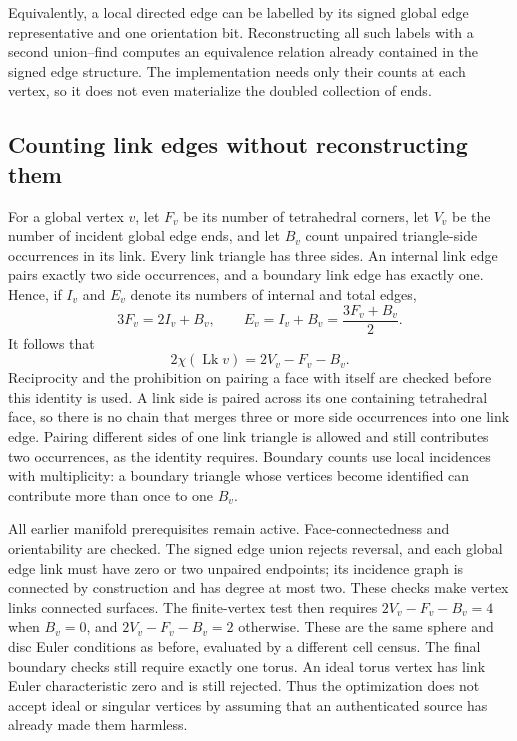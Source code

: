 Equivalently, a local directed edge can be labelled by its signed global edge
representative and one orientation bit. Reconstructing all such labels with
a second union--find computes an equivalence relation already contained in
the signed edge structure. The implementation needs only their counts at
each vertex, so it does not even materialize the doubled collection of ends.

\subsection{Counting link edges without reconstructing them}

For a global vertex $v$, let $F_v$ be its number of tetrahedral corners, let
$V_v$ be the number of incident global edge ends, and let $B_v$ count unpaired
triangle-side occurrences in its link. Every link triangle has three sides.
An internal link edge pairs exactly two side occurrences, and a boundary
link edge has exactly one. Hence, if $I_v$ and $E_v$ denote its numbers of
internal and total edges,
\[
 3F_v=2I_v+B_v,\qquad E_v=I_v+B_v=\frac{3F_v+B_v}{2}.
\]
It follows that
\[
 2\chi(\operatorname{Lk}v)=2V_v-F_v-B_v.
\]
Reciprocity and the prohibition on pairing a face with itself are checked
before this identity is used. A link side is paired across its one containing
tetrahedral face, so there is no chain that merges three or more side
occurrences into one link edge. Pairing different sides of one link triangle
is allowed and still contributes two occurrences, as the identity requires.
Boundary counts use local incidences with multiplicity: a boundary triangle
whose vertices become identified can contribute more than once to one $B_v$.

All earlier manifold prerequisites remain active. Face-connectedness and
orientability are checked. The signed edge union rejects reversal, and each
global edge link must have zero or two unpaired endpoints; its incidence
graph is connected by construction and has degree at most two. These checks
make vertex links connected surfaces. The finite-vertex test then requires
$2V_v-F_v-B_v=4$ when $B_v=0$, and $2V_v-F_v-B_v=2$ otherwise. These are the
same sphere and disc Euler conditions as before, evaluated by a different
cell census. The final boundary checks still require exactly one torus.
An ideal torus vertex has link Euler characteristic zero and is still rejected.
Thus the optimization does not accept ideal or singular vertices by assuming
that an authenticated source has already made them harmless.

